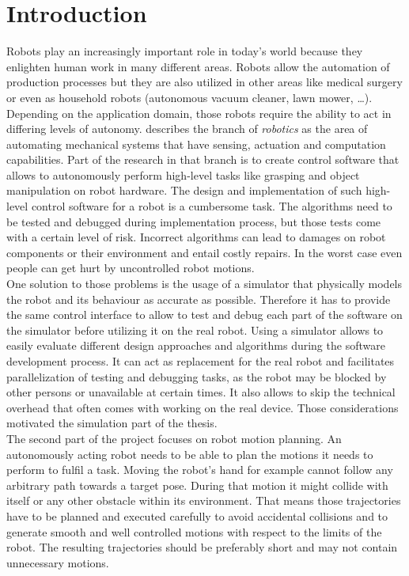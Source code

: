 
\chapter{Introduction}
\label{chap:introduction}

Robots play an increasingly important role in today's world because they enlighten human work in many different areas. Robots allow the automation of production processes but they are also utilized in other areas like medical surgery or even as household robots (autonomous vacuum cleaner, lawn mower, \ldots). Depending on the application domain, those robots require the ability to act in differing levels of autonomy. \citep{lavalle2006} describes the branch of \emph{robotics} as the area of automating mechanical systems that have sensing, actuation and computation capabilities. Part of the research in that branch is to create control software that allows to autonomously perform high-level tasks like grasping and object manipulation on robot hardware. The design and implementation of such high-level control software for a robot is a cumbersome task. The algorithms need to be tested and debugged during implementation process, but those tests come with a certain level of risk. Incorrect algorithms can lead to damages on robot components or their environment and entail costly repairs. In the worst case even people can get hurt by uncontrolled robot motions.\\

One solution to those problems is the usage of a simulator that physically models the robot and its behaviour as accurate as possible. Therefore it has to provide the same control interface to allow to test and debug each part of the software on the simulator before utilizing it on the real robot. Using a simulator allows to easily evaluate different design approaches and algorithms during the software development process. It can act as replacement for the real robot and facilitates parallelization of testing and debugging tasks, as the robot may be blocked by other persons or unavailable at certain times. It also allows to skip the technical overhead that often comes with working on the real device. Those considerations motivated the simulation part of the thesis. \\

The second part of the project focuses on robot motion planning. An autonomously acting robot needs to be able to plan the motions it needs to perform to fulfil a task. Moving the robot's hand for example cannot follow any arbitrary path towards a target pose. During that motion it might collide with itself or any other obstacle within its environment. That means those trajectories have to be planned and executed carefully to avoid accidental collisions and to generate smooth and well controlled motions with respect to the limits of the robot. The resulting trajectories should be preferably short and may not contain unnecessary motions. 


